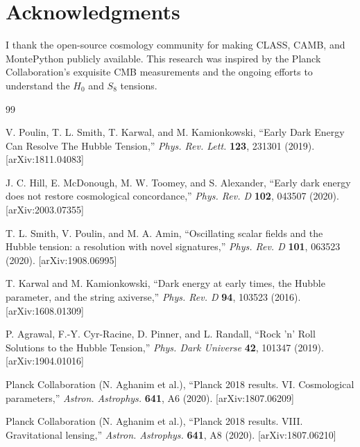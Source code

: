 \documentclass[11pt,a4paper]{article}
\theoremstyle{definition}
\theoremstyle{remark}
\begin{document}
\section*{Acknowledgments}

I thank the open-source cosmology community for making CLASS, CAMB, and MontePython publicly available. This research was inspired by the Planck Collaboration's exquisite CMB measurements and the ongoing efforts to understand the $H_0$ and $S_8$ tensions.

\begin{thebibliography}{99}


V. Poulin, T. L. Smith, T. Karwal, and M. Kamionkowski,
``Early Dark Energy Can Resolve The Hubble Tension,''
\emph{Phys. Rev. Lett.} \textbf{123}, 231301 (2019).
[arXiv:1811.04083]

J. C. Hill, E. McDonough, M. W. Toomey, and S. Alexander,
``Early dark energy does not restore cosmological concordance,''
\emph{Phys. Rev. D} \textbf{102}, 043507 (2020).
[arXiv:2003.07355]

T. L. Smith, V. Poulin, and M. A. Amin,
``Oscillating scalar fields and the Hubble tension: a resolution with novel signatures,''
\emph{Phys. Rev. D} \textbf{101}, 063523 (2020).
[arXiv:1908.06995]

T. Karwal and M. Kamionkowski,
``Dark energy at early times, the Hubble parameter, and the string axiverse,''
\emph{Phys. Rev. D} \textbf{94}, 103523 (2016).
[arXiv:1608.01309]

P. Agrawal, F.-Y. Cyr-Racine, D. Pinner, and L. Randall,
``Rock 'n' Roll Solutions to the Hubble Tension,''
\emph{Phys. Dark Universe} \textbf{42}, 101347 (2019).
[arXiv:1904.01016]


Planck Collaboration (N. Aghanim et al.),
``Planck 2018 results. VI. Cosmological parameters,''
\emph{Astron. Astrophys.} \textbf{641}, A6 (2020).
[arXiv:1807.06209]

Planck Collaboration (N. Aghanim et al.),
``Planck 2018 results. VIII. Gravitational lensing,''
\emph{Astron. Astrophys.} \textbf{641}, A8 (2020).
[arXiv:1807.06210]


\end{thebibliography}
\end{document}
